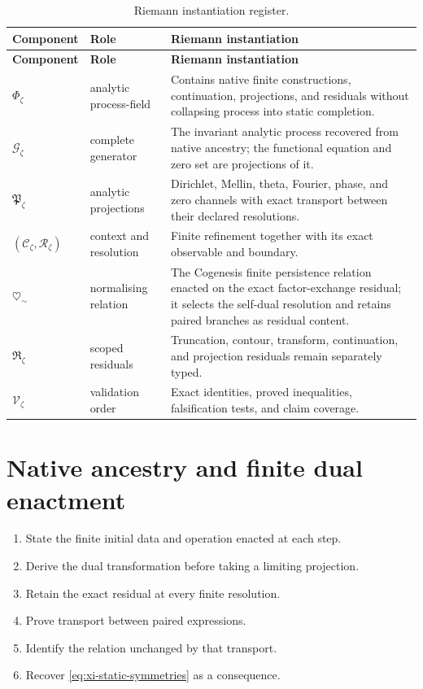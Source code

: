 \documentclass[11pt,a4paper]{article}
\theoremstyle{definition}
\newcommand{\Field}{\Phi}
\newcommand{\Gen}{\mathcal{G}}
\newcommand{\Proj}{\mathfrak{P}}
\newcommand{\Residual}{\mathfrak{R}}
\newcommand{\Validation}{\mathcal{V}}
\newcommand{\heartsim}{\heartsuit_{\sim}}
\newcommand{\Cctx}{\mathcal{C}}
\newcommand{\Rres}{\mathcal{R}}
\begin{document}
\begin{longtable}{@{}p{}p{}p{}@{}}
\caption{Riemann instantiation register.}
\label{tab:instantiation-register}\\
\toprule
\textbf{Component} & \textbf{Role} & \textbf{Riemann instantiation} \\
\midrule
\endfirsthead
\toprule
\textbf{Component} & \textbf{Role} & \textbf{Riemann instantiation} \\
\midrule
\endhead
$\Field_{\zeta}$ & analytic process-field &
Contains native finite constructions, continuation, projections, and
residuals without collapsing process into static completion. \\
$\Gen_{\zeta}$ & complete generator &
The invariant analytic process recovered from native ancestry; the functional
equation and zero set are projections of it. \\
$\Proj_{\zeta}$ & analytic projections &
Dirichlet, Mellin, theta, Fourier, phase, and zero channels with exact transport
between their declared resolutions. \\
$(\Cctx_{\zeta},\Rres_{\zeta})$ & context and resolution &
Finite refinement together with its exact observable and boundary. \\
$\heartsim$ & normalising relation &
The Cogenesis finite persistence relation enacted on the exact factor-exchange
residual; it selects the self-dual resolution and retains paired branches as
residual content. \\
$\Residual_{\zeta}$ & scoped residuals &
Truncation, contour, transform, continuation, and projection residuals remain
separately typed. \\
$\Validation_{\zeta}$ & validation order &
Exact identities, proved inequalities, falsification tests, and claim coverage. \\
\bottomrule
\end{longtable}

\section{Native ancestry and finite dual enactment}
\label{sec:native-ancestry}

\begin{keybox}[title={\bfseries Derivation order}]
\begin{enumerate}[label=\textbf{A\arabic*.},leftmargin=*]
  \item State the finite initial data and operation enacted at each step.
  \item Derive the dual transformation before taking a limiting projection.
  \item Retain the exact residual at every finite resolution.
  \item Prove transport between paired expressions.
  \item Identify the relation unchanged by that transport.
  \item Recover \cref{eq:xi-static-symmetries} as a consequence.
\end{enumerate}
\end{keybox}
\end{document}
